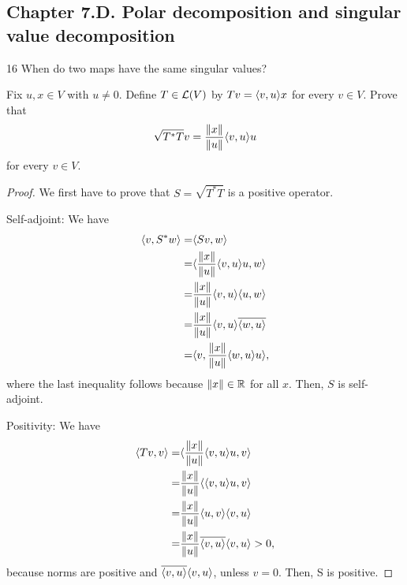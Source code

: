 \subsection*{Chapter 7.D. Polar decomposition and singular value decomposition}

16 When do two maps have the same singular values?

\begin{exercise}{1}
  Fix $u,x\in V$ with $u\neq 0$. Define $T\in\mathcal{L}(V)$ by $Tv =\langle v,u\rangle x$ for every $v\in V$. Prove that
  \[
  \sqrt{T^\ast T}v=\frac{\left\lVert x\right\rVert}{\left\lVert u\right\rVert}\langle v,u\rangle u
  \]
  for every $v\in V$.
\end{exercise}
\begin{proof}
 We first have to prove that $S=\sqrt{T^\ast T}$ is a positive operator.
 
 Self-adjoint: We have 
 \begin{align*}
     \langle v, S^\ast w\rangle =& \langle Sv, w\rangle\\
     =& \langle \frac{\left\lVert x\right\rVert}{\left\lVert u\right\rVert}\langle v,u\rangle u, w\rangle\\
     =& \frac{\left\lVert x\right\rVert}{\left\lVert u\right\rVert}\langle v,u\rangle\langle u, w\rangle\\
     =& \frac{\left\lVert x\right\rVert}{\left\lVert u\right\rVert}\langle v,u\rangle\overline{\langle w, u\rangle}\\
     =& \langle v,\frac{\left\lVert x\right\rVert}{\left\lVert u\right\rVert}\langle w, u\rangle u\rangle,
 \end{align*}
 where the last inequality follows because $\left\lVert x\right\rVert\in\mathbb{R}$ for all $x$. Then, $S$ is self-adjoint.

 Positivity: We have
 \begin{align*}
     \langle Tv,v\rangle =& \langle \frac{\left\lVert x\right\rVert}{\left\lVert u\right\rVert}\langle v,u\rangle u,v\rangle\\
     =& \frac{\left\lVert x\right\rVert}{\left\lVert u\right\rVert}\langle \langle v,u\rangle u,v\rangle\\
     =& \frac{\left\lVert x\right\rVert}{\left\lVert u\right\rVert}\langle u,v\rangle\langle v,u\rangle\\
     =& \frac{\left\lVert x\right\rVert}{\left\lVert u\right\rVert}\overline{\langle v,u\rangle}\langle v,u\rangle>0,
 \end{align*}
 because norms are positive and $\overline{\langle v,u\rangle}\langle v,u\rangle$, unless $v=0$. Then, S is positive.
 

\end{proof}
